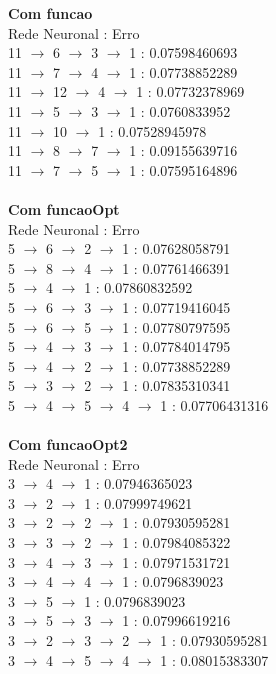 \documentclass{article}
\begin{document}
\textbf{Com funcao}\\
Rede Neuronal : Erro\\
11 $\to$ 6 $\to$ 3 $\to$ 1 : 0.07598460693\\
11 $\to$ 7 $\to$ 4 $\to$ 1 : 0.07738852289\\
11 $\to$ 12 $\to$ 4 $\to$ 1 : 0.07732378969\\
11 $\to$ 5 $\to$ 3 $\to$ 1 : 0.0760833952\\
11 $\to$ 10 $\to$ 1 : 0.07528945978\\
11 $\to$ 8 $\to$ 7 $\to$ 1 : 0.09155639716\\
11 $\to$ 7 $\to$ 5 $\to$ 1 : 0.07595164896\\
\\
\textbf{Com funcaoOpt}\\
Rede Neuronal : Erro\\
5 $\to$ 6 $\to$ 2 $\to$ 1 : 0.07628058791\\
5 $\to$ 8 $\to$ 4 $\to$ 1 : 0.07761466391\\
5 $\to$ 4 $\to$ 1 : 0.07860832592\\
5 $\to$ 6 $\to$ 3 $\to$ 1 : 0.07719416045\\
5 $\to$ 6 $\to$ 5 $\to$ 1 : 0.07780797595\\
5 $\to$ 4 $\to$ 3 $\to$ 1 : 0.07784014795\\
5 $\to$ 4 $\to$ 2 $\to$ 1 : 0.07738852289\\
5 $\to$ 3 $\to$ 2 $\to$ 1 : 0.07835310341\\
5 $\to$ 4 $\to$ 5 $\to$ 4 $\to$ 1 : 0.07706431316\\
\\
\textbf{Com funcaoOpt2}\\
Rede Neuronal : Erro\\
3 $\to$ 4 $\to$ 1 : 0.07946365023\\
3 $\to$ 2 $\to$ 1 : 0.07999749621\\
3 $\to$ 2 $\to$ 2 $\to$ 1 : 0.07930595281\\
3 $\to$ 3 $\to$ 2 $\to$ 1 : 0.07984085322\\
3 $\to$ 4 $\to$ 3 $\to$ 1 : 0.07971531721\\
3 $\to$ 4 $\to$ 4 $\to$ 1 : 0.0796839023\\
3 $\to$ 5 $\to$ 1 : 0.0796839023\\
3 $\to$ 5 $\to$ 3 $\to$ 1 : 0.07996619216\\
3 $\to$ 2 $\to$ 3 $\to$ 2 $\to$ 1 : 0.07930595281\\
3 $\to$ 4 $\to$ 5 $\to$ 4 $\to$ 1 : 0.08015383307\\
\end{document}
